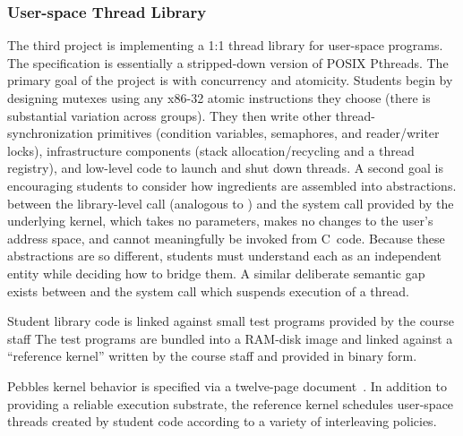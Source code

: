 \subsubsection{User-space Thread Library}
The third project is implementing a 1:1 thread library for
user-space programs.
The  specification is essentially a stripped-down
version of POSIX Pthreads.
The primary goal of the project is
with concurrency and atomicity.
Students begin by designing mutexes using any
x86-32 atomic instructions they choose
(there is substantial variation across groups).
They then write other thread-synchronization
primitives (condition variables, semaphores,
and reader/writer locks), infrastructure
components (stack allocation/recycling and
a thread registry),
and low-level code to launch and shut down
threads.
A second goal is encouraging students to
consider how ingredients are assembled into
abstractions.
between the library-level 
call (analogous to )
and the  system call provided
by the underlying kernel,
which takes no parameters,
makes no changes to the user's address space,
and cannot meaningfully
be invoked from C~code.
Because these abstractions are so different,
students must
understand each as an independent entity while
deciding how to bridge them.
A similar deliberate semantic gap exists between
 and the system call
which suspends execution of a thread.

Student library code is linked against small
test programs provided by the course staff
The test programs are bundled into a RAM-disk
image and linked against a ``reference kernel'' written by
the course staff
and provided in binary form.

Pebbles kernel behavior is specified
via a twelve-page document~\cite{kspec}.
In addition to providing a reliable execution
substrate,
the reference kernel schedules
 user-space threads created by
student code according to a variety of
interleaving policies.

